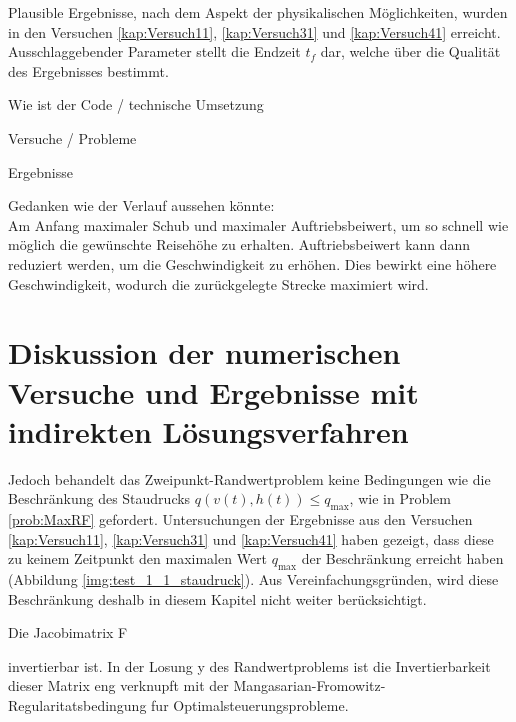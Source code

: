 Plausible Ergebnisse, nach dem Aspekt der physikalischen Möglichkeiten, wurden in den Versuchen \ref{kap:Versuch11}, \ref{kap:Versuch31} und  \ref{kap:Versuch41} erreicht. Ausschlaggebender Parameter stellt die Endzeit $t_f$ dar, welche über die Qualität des Ergebnisses bestimmt.

Wie ist der Code / technische Umsetzung 

Versuche / Probleme 

Ergebnisse


Gedanken wie der Verlauf aussehen könnte:\\
Am Anfang maximaler Schub und maximaler Auftriebsbeiwert, um so schnell wie möglich die gewünschte Reisehöhe zu erhalten. Auftriebsbeiwert kann dann reduziert werden, um die Geschwindigkeit zu erhöhen. Dies bewirkt eine höhere Geschwindigkeit, wodurch die zurückgelegte Strecke maximiert wird.













\section{Diskussion der numerischen Versuche und Ergebnisse mit indirekten Lösungsverfahren}
Jedoch behandelt das Zweipunkt-Randwertproblem keine Bedingungen wie die Beschränkung des Staudrucks $q(v(t),h(t)) \leq q_{\max}$, wie in Problem \ref{prob:MaxRF} gefordert. Untersuchungen der Ergebnisse aus den Versuchen \ref{kap:Versuch11}, \ref{kap:Versuch31} und  \ref{kap:Versuch41} haben gezeigt, dass diese zu keinem Zeitpunkt den maximalen Wert $q_{\max}$ der Beschränkung erreicht haben (Abbildung \ref{img:test_1_1_staudruck}). Aus Vereinfachungsgründen, wird diese Beschränkung deshalb in diesem Kapitel nicht weiter berücksichtigt.




Die Jacobimatrix F

invertierbar ist. In der Losung y des Randwertproblems ist die Invertierbarkeit dieser Matrix eng verknupft mit der Mangasarian-Fromowitz-Regularitatsbedingung
fur Optimalsteuerungsprobleme.